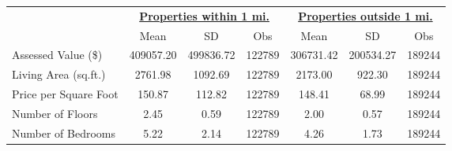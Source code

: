 {
\def\sym#1{\ifmmode^{#1}\else\(^{#1}\)\fi}
\begin{tabular}{l*{2}{ccc}}
\toprule
                &\multicolumn{3}{c}{\textbf{\underline{Properties within 1 mi.}}}&\multicolumn{3}{c}{\textbf{\underline{Properties outside 1 mi.}}}\\
                &     Mean&       SD&      Obs&     Mean&       SD&      Obs\\
\midrule
Assessed Value (\$)&409057.20&499836.72&   122789&306731.42&200534.27&   189244\\
Living Area (sq.ft.)&  2761.98&  1092.69&   122789&  2173.00&   922.30&   189244\\
Price per Square Foot&   150.87&   112.82&   122789&   148.41&    68.99&   189244\\
Number of Floors&     2.45&     0.59&   122789&     2.00&     0.57&   189244\\
Number of Bedrooms&     5.22&     2.14&   122789&     4.26&     1.73&   189244\\
\bottomrule
\end{tabular}
}
